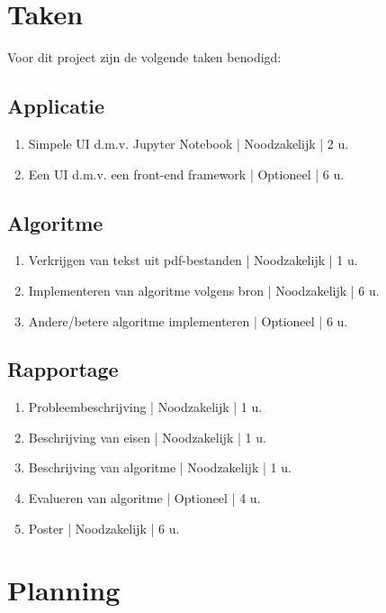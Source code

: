 \documentclass{article}
\begin{document}
\section{Taken}

Voor dit project zijn de volgende taken benodigd:

\subsection{Applicatie}

\begin{enumerate}
  \item Simpele UI d.m.v. Jupyter Notebook | Noodzakelijk | 2 u.
  \item Een UI d.m.v. een front-end framework | Optioneel | 6 u.
\end{enumerate}

\subsection{Algoritme}

\begin{enumerate}
  \item Verkrijgen van tekst uit pdf-bestanden | Noodzakelijk | 1 u.
  \item Implementeren van algoritme volgens bron | Noodzakelijk | 6 u.
  \item Andere/betere algoritme implementeren | Optioneel | 6 u.
\end{enumerate}

\subsection{Rapportage}

\begin{enumerate}
  \item Probleembeschrijving | Noodzakelijk | 1 u.
  \item Beschrijving van eisen | Noodzakelijk | 1 u.
  \item Beschrijving van algoritme | Noodzakelijk | 1 u.
  \item Evalueren van algoritme | Optioneel | 4 u.
  \item Poster | Noodzakelijk | 6 u.
\end{enumerate}

\section{Planning}
\end{document}
